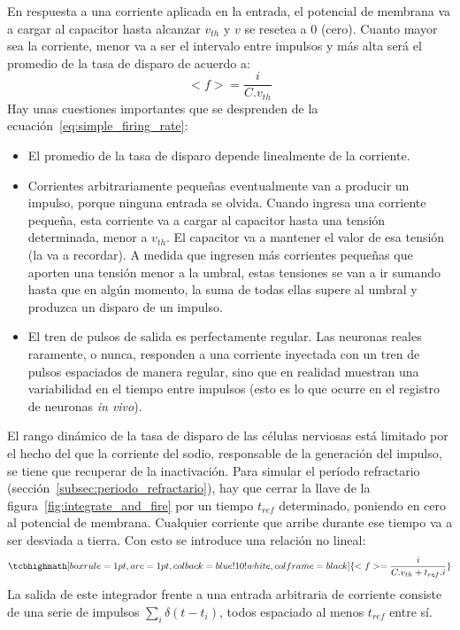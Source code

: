En respuesta a una corriente aplicada en la entrada, el potencial de membrana va a cargar al capacitor hasta alcanzar $v_{th}$ y $v$ se resetea a 0 (cero). Cuanto mayor sea la corriente, menor va a ser el intervalo entre impulsos y más alta será el promedio de la tasa de disparo de acuerdo a:
\begin{equation}\label{eq:simple_firing_rate}
    <f>=\frac{i}{C.v_{th}}
\end{equation}
Hay unas cuestiones importantes que se desprenden de la ecuación~\ref{eq:simple_firing_rate}:
\begin{itemize}
    \item El promedio de la tasa de disparo depende linealmente de la corriente.
    \item Corrientes arbitrariamente pequeñas eventualmente van a producir un impulso, porque ninguna entrada se olvida. Cuando ingresa una corriente pequeña, esta corriente va a cargar al capacitor hasta una tensión determinada, menor a $v_{th}$. El capacitor va a mantener el valor de esa tensión (la va a recordar). A medida que ingresen más corrientes pequeñas que aporten una tensión menor a la umbral, estas tensiones se van a ir sumando hasta que en algún momento, la suma de todas ellas supere al umbral y produzca un disparo de un impulso.
    \item El tren de pulsos de salida es perfectamente regular. Las neuronas reales raramente, o nunca, responden a una corriente inyectada con un tren de pulsos espaciados de manera regular, sino que en realidad muestran una variabilidad en el tiempo entre impulsos (esto es lo que ocurre en el registro de neuronas \textit{in vivo}\cite{10.5555/1137840}).
\end{itemize}
El rango dinámico de la tasa de disparo de las células nerviosas está limitado por el hecho del que la corriente del sodio, responsable de la generación del impulso, se tiene que recuperar de la inactivación. Para simular el período refractario (sección~\ref{subsec:periodo_refractario}), hay que cerrar la llave de la figura~\ref{fig:integrate_and_fire} por un tiempo $t_{ref}$ determinado, poniendo en cero al potencial de membrana. Cualquier corriente que arribe durante ese tiempo va a ser desviada a tierra. Con esto se introduce una relación no lineal:
\begin{equation}
   \tcbhighmath[boxrule=1pt,arc=1pt,colback=blue!10!white,colframe=black]{ <f>=\frac{i}{C.v_{th}+t_{ref}.i}}
\end{equation}
La salida de este integrador frente a una entrada arbitraria de corriente consiste de una serie de impulsos $\sum_i \delta(t-t_i)$, todos espaciado al menos $t_{ref}$ entre sí. 
\newpage
